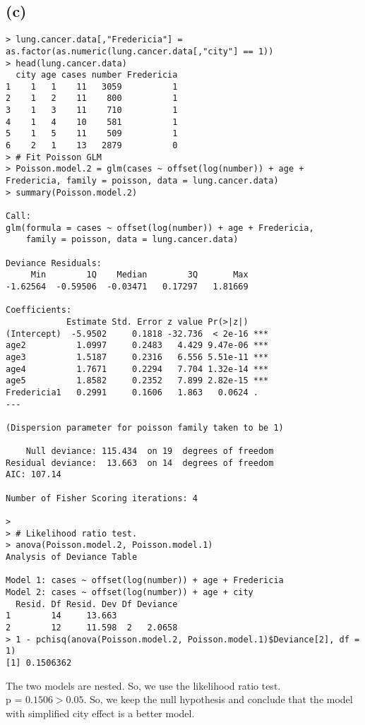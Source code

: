 \subsection*{(c)}
\begin{lstlisting}
> lung.cancer.data[,"Fredericia"] = as.factor(as.numeric(lung.cancer.data[,"city"] == 1))
> head(lung.cancer.data)
  city age cases number Fredericia
1    1   1    11   3059          1
2    1   2    11    800          1
3    1   3    11    710          1
4    1   4    10    581          1
5    1   5    11    509          1
6    2   1    13   2879          0
> # Fit Poisson GLM
> Poisson.model.2 = glm(cases ~ offset(log(number)) + age + Fredericia, family = poisson, data = lung.cancer.data)
> summary(Poisson.model.2)

Call:
glm(formula = cases ~ offset(log(number)) + age + Fredericia, 
    family = poisson, data = lung.cancer.data)

Deviance Residuals: 
     Min        1Q    Median        3Q       Max  
-1.62564  -0.59506  -0.03471   0.17297   1.81669  

Coefficients:
            Estimate Std. Error z value Pr(>|z|)    
(Intercept)  -5.9502     0.1818 -32.736  < 2e-16 ***
age2          1.0997     0.2483   4.429 9.47e-06 ***
age3          1.5187     0.2316   6.556 5.51e-11 ***
age4          1.7671     0.2294   7.704 1.32e-14 ***
age5          1.8582     0.2352   7.899 2.82e-15 ***
Fredericia1   0.2991     0.1606   1.863   0.0624 .  
---

(Dispersion parameter for poisson family taken to be 1)

    Null deviance: 115.434  on 19  degrees of freedom
Residual deviance:  13.663  on 14  degrees of freedom
AIC: 107.14

Number of Fisher Scoring iterations: 4

> 
> # Likelihood ratio test.
> anova(Poisson.model.2, Poisson.model.1)
Analysis of Deviance Table

Model 1: cases ~ offset(log(number)) + age + Fredericia
Model 2: cases ~ offset(log(number)) + age + city
  Resid. Df Resid. Dev Df Deviance
1        14     13.663            
2        12     11.598  2   2.0658
> 1 - pchisq(anova(Poisson.model.2, Poisson.model.1)$Deviance[2], df = 1)
[1] 0.1506362
\end{lstlisting}

The two models are nested. So, we use the likelihood ratio test.\\
p = $0.1506 > 0.05$. So, we keep the null hypothesis and conclude that the model with simplified city effect is a better model.


